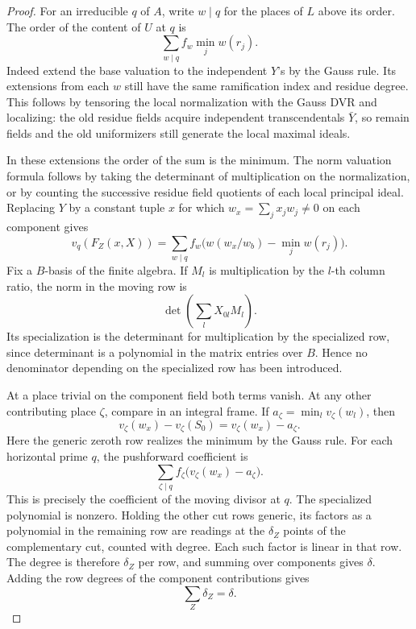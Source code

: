 \begin{proof}
For an irreducible \(q\) of \(A\), write \(w\mid q\) for the
places of \(L\) above its order. The order of the content of
\(U\) at \(q\) is
\[
           \sum_{w\mid q} f_w\min_j w(r_j).
\]
Indeed extend the base valuation to the independent \(Y\)'s
by the Gauss rule. Its extensions from each \(w\) still have
the same ramification index and residue degree. This follows
by tensoring the local normalization with the Gauss DVR and
localizing: the old residue fields acquire independent
transcendentals \(\bar Y\), so remain fields and the old
uniformizers still generate the local maximal ideals.

In these extensions the order of the sum is the minimum.
The norm valuation formula follows by taking the determinant
of multiplication on the normalization, or by counting the
successive residue field quotients of each local principal
ideal. Replacing \(Y\) by a constant tuple \(x\) for which
\(w_x=\sum_jx_j w_j\ne0\) on each component gives
\[
 v_q(F_Z(x,X))=
   \sum_{w\mid q} f_w\big(w(w_x/w_b)-\min_j w(r_j)\big).
\]
Fix a \(B\)-basis of the finite algebra. If \(M_l\)
is multiplication by the \(l\)-th column ratio, the norm in
the moving row is
\[
             \det\!\left(\sum_l X_{0l}M_l\right).
\]
Its specialization is the determinant for multiplication
by the specialized row, since determinant is a polynomial
in the matrix entries over \(B\). Hence no denominator
depending on the specialized row has been introduced.

At a place trivial on the component field both terms vanish.
At any other contributing place \(\zeta\), compare in an
integral frame. If \(a_\zeta=\min_l v_\zeta(w_l)\), then
\[
       v_\zeta(w_x)-v_\zeta(S_0)=v_\zeta(w_x)-a_\zeta .
\]
Here the generic zeroth row realizes the minimum by the
Gauss rule. For each horizontal prime \(q\), the pushforward coefficient is
\[
 \sum_{\zeta\mid q} f_{\zeta}
            \bigl(v_{\zeta}(w_x)-a_{\zeta}\bigr).
\]
This is precisely the coefficient of the moving divisor at \(q\).
The specialized polynomial is nonzero. Holding the other cut rows
generic, its factors as a polynomial in the remaining row are
readings at the \(\delta_Z\) points of the complementary cut,
counted with degree. Each such factor is linear in that row. The
degree is therefore \(\delta_Z\) per row, and summing over components
gives \(\delta\).
Adding the row degrees of the component contributions gives
\[
  \sum_Z\delta_Z=\delta .
\]


\end{proof}
